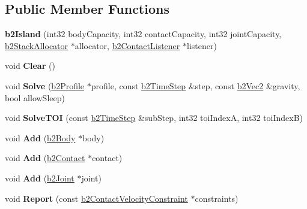\subsection*{Public Member Functions}
\begin{DoxyCompactItemize}
\item 
\mbox{\label{classb2Island_a2f2258f09d2663dcb35a1d69d16896cb}} 
{\bfseries b2\+Island} (int32 body\+Capacity, int32 contact\+Capacity, int32 joint\+Capacity, \hyperlink{classb2StackAllocator}{b2\+Stack\+Allocator} $\ast$allocator, \hyperlink{classb2ContactListener}{b2\+Contact\+Listener} $\ast$listener)
\item 
\mbox{\label{classb2Island_a26566f7388fcaf7523446e5e76d99c4d}} 
void {\bfseries Clear} ()
\item 
\mbox{\label{classb2Island_a28a6f74174cde3a6e93663c740f418fa}} 
void {\bfseries Solve} (\hyperlink{structb2Profile}{b2\+Profile} $\ast$profile, const \hyperlink{structb2TimeStep}{b2\+Time\+Step} \&step, const \hyperlink{structb2Vec2}{b2\+Vec2} \&gravity, bool allow\+Sleep)
\item 
\mbox{\label{classb2Island_a61f577b473962bb0d8add1f55eeef7ee}} 
void {\bfseries Solve\+T\+OI} (const \hyperlink{structb2TimeStep}{b2\+Time\+Step} \&sub\+Step, int32 toi\+IndexA, int32 toi\+IndexB)
\item 
\mbox{\label{classb2Island_af2d54861bd063051c0a6dc5f73b27c3e}} 
void {\bfseries Add} (\hyperlink{classb2Body}{b2\+Body} $\ast$body)
\item 
\mbox{\label{classb2Island_abc0ea9208e818b551404fd507f197a51}} 
void {\bfseries Add} (\hyperlink{classb2Contact}{b2\+Contact} $\ast$contact)
\item 
\mbox{\label{classb2Island_a04e6ccd0c11f6ef5a7ed0a926d081445}} 
void {\bfseries Add} (\hyperlink{classb2Joint}{b2\+Joint} $\ast$joint)
\item 
\mbox{\label{classb2Island_a57620f76faf000f61c76e925e40e6129}} 
void {\bfseries Report} (const \hyperlink{structb2ContactVelocityConstraint}{b2\+Contact\+Velocity\+Constraint} $\ast$constraints)
\item 

\end{DoxyCompactItemize}
